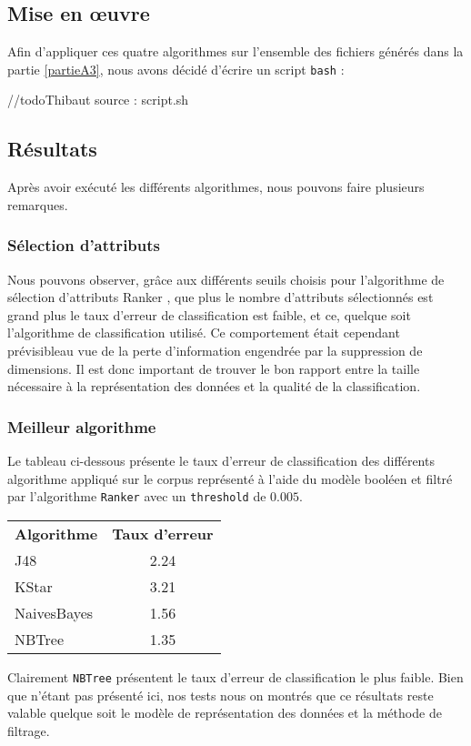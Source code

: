 \subsection{Mise en œuvre}
Afin d'appliquer ces quatre algorithmes sur l'ensemble des fichiers générés dans la partie \vref{partieA3}, nous avons décidé d'écrire un script \texttt{bash} :

//todo{Thibaut} source : script.sh

\subsection{Résultats}

Après avoir exécuté les différents algorithmes, nous pouvons faire plusieurs remarques.

\subsubsection{Sélection d'attributs}
Nous pouvons observer, grâce aux différents seuils choisis pour l'algorithme de sélection d'attributs \og Ranker \fg{}, que plus le nombre d'attributs sélectionnés est grand plus le taux d'erreur de classification est faible, et ce, quelque soit l'algorithme de classification utilisé. Ce comportement était cependant prévisibleau vue de la perte d'information engendrée par la suppression de dimensions. Il est donc important de trouver le bon rapport entre la taille nécessaire à la représentation des données et la qualité de la classification.  

\subsubsection{Meilleur algorithme}

Le tableau ci-dessous présente le taux d'erreur de classification des différents algorithme appliqué sur le corpus représenté à l'aide du modèle booléen et filtré par l'algorithme \texttt{Ranker} avec un \texttt{threshold} de $0.005$.

\begin{tabular}{l c} 
\textbf{Algorithme} & \textbf{Taux d'erreur}\\
J48 & 2.24\\
KStar & 3.21\\
NaivesBayes & 1.56\\
NBTree & 1.35\\
\end{tabular}

Clairement \texttt{NBTree} présentent le taux d'erreur de classification le plus faible. Bien que n'étant pas présenté ici, nos tests nous on montrés que ce résultats reste valable quelque soit le modèle de représentation des données  et la méthode de filtrage.

